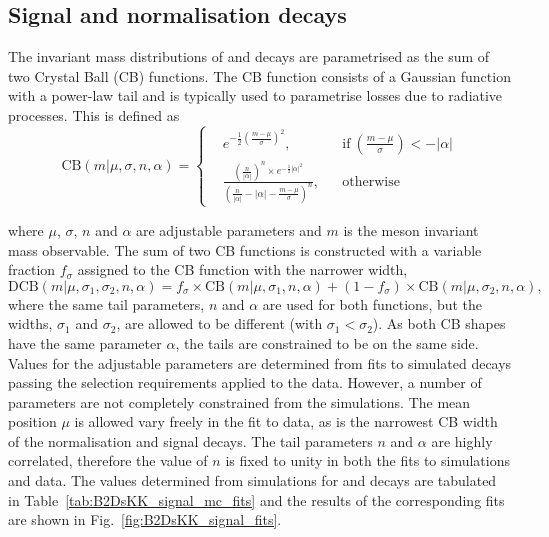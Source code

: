 \subsection{Signal and normalisation decays}
\label{sec:B2DsKK_sigcomps}

The invariant mass distributions of \decay{\Bp}{\Dsp\Dzb} and \decay{\Bp}{\Dsp\Kp\Km} decays are parametrised as the sum of two Crystal Ball (CB) functions.
The CB function consists of a Gaussian function with a power-law tail and is typically used to parametrise losses due to radiative processes.
This is defined as
\begin{equation}
\text{CB}(m|\mu,\sigma,n,\alpha) = \left \{
  \begin{aligned}
    &e^{-\frac{1}{2} \left(\frac{m-\mu}{\sigma}\right)^2}, && \text{if}\ \left(\frac{m-\mu}{\sigma}\right) < -|\alpha|\\
    &\frac{\left(\frac{n}{|\alpha|}\right)^n\times e ^{-\frac{1}{2}|\alpha|^2} }{\left(\frac{n}{|\alpha|}-|\alpha| - \frac{m-\mu}{\sigma}\right)^n}, && \text{otherwise}
  \end{aligned} \right.
\end{equation} 

where $\mu$, $\sigma$, $n$ and $\alpha$ are adjustable parameters and $m$ is the \B meson invariant mass observable.
The sum of two CB functions is constructed with a variable fraction $f_\sigma$ assigned to the CB function with the narrower width,
\begin{equation}
\text{DCB}(m|\mu,\sigma_1,\sigma_2,n,\alpha) = f_\sigma \times \text{CB}(m|\mu,\sigma_1,n,\alpha) + (1-f_\sigma) \times \text{CB}(m|\mu,\sigma_2,n,\alpha),
\label{eq:DoubleBD}
\end{equation}
where the same tail parameters, $n$ and $\alpha$ are used for both functions, but the widths, $\sigma_1$ and $\sigma_2$, are allowed to be different (with $\sigma_1 < \sigma_2$).
As both CB shapes have the same parameter $\alpha$, the tails are constrained to be on the same side.
Values for the adjustable parameters are determined from fits to simulated decays passing the selection requirements applied to the data. 
However, a number of parameters are not completely constrained from the simulations. The mean position $\mu$ is allowed vary freely in the fit to data, as is the narrowest CB width of the normalisation and signal decays. 
The tail parameters $n$ and $\alpha$ are highly correlated, therefore the value of $n$ is fixed to unity in both the fits to simulations and data. The values determined from simulations for \decay{\Bp}{\Dsp\Dzb} and \decay{\Bp}{\Dsp\Kp\Km} decays are tabulated in Table~\ref{tab:B2DsKK_signal_mc_fits} and the results of the corresponding fits are shown in Fig.~\ref{fig:B2DsKK_signal_fits}.


